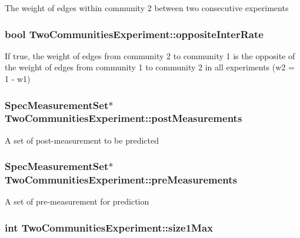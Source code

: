 The weight of edges within community 2 between two consecutive experiments \hypertarget{class_two_communities_experiment_ade325f42fa637fae8e1c5496216c6bac}{
\subsubsection[{opposite\-Inter\-Rate}]{\setlength{\rightskip}{0pt plus 5cm}bool Two\-Communities\-Experiment\-::opposite\-Inter\-Rate}}\label{class_two_communities_experiment_ade325f42fa637fae8e1c5496216c6bac}
If true, the weight of edges from community 2 to community 1 is the opposite of the weight of edges from community 1 to community 2 in all experiments (w2 = 1 -\/ w1) \hypertarget{class_two_communities_experiment_a78016b6845b3752c0a83f09793653ecc}{
\subsubsection[{post\-Measurements}]{\setlength{\rightskip}{0pt plus 5cm}Spec\-Measurement\-Set$\ast$ Two\-Communities\-Experiment\-::post\-Measurements}}\label{class_two_communities_experiment_a78016b6845b3752c0a83f09793653ecc}
A set of post-\/measurement to be predicted \hypertarget{class_two_communities_experiment_a1e681dca94bf8bf967d0586acee25ac1}{
\subsubsection[{pre\-Measurements}]{\setlength{\rightskip}{0pt plus 5cm}Spec\-Measurement\-Set$\ast$ Two\-Communities\-Experiment\-::pre\-Measurements}}\label{class_two_communities_experiment_a1e681dca94bf8bf967d0586acee25ac1}
A set of pre-\/measurement for prediction \hypertarget{class_two_communities_experiment_af5352ec73c0b6090e51e3757fc553be7}{
\subsubsection[{size1\-Max}]{\setlength{\rightskip}{0pt plus 5cm}int Two\-Communities\-Experiment\-::size1\-Max}}\label{class_two_communities_experiment_af5352ec73c0b6090e51e3757fc553be7}
